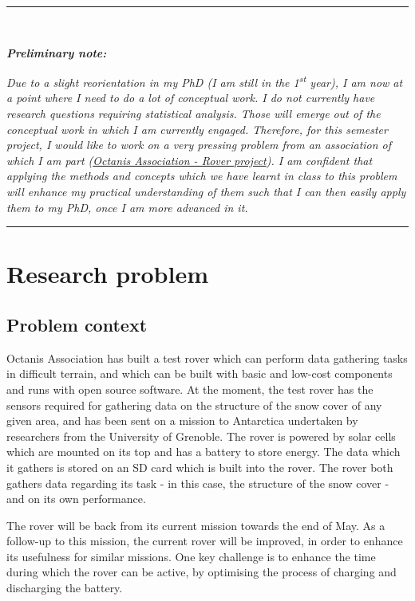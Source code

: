 \documentclass[11pt, UKenglish]{report}
\newcommand{\HRule}[1]{\rule{\linewidth}{#1}}
\begin{document}
\noindent \HRule{0.5pt} \\
\large{\textit{\textbf{Preliminary note:}} 

\normalsize

\noindent \textit{Due to a slight reorientation in my PhD (I am still in the 1\textsuperscript{st} year), I am now at a point where I need to do a lot of conceptual work. I do not currently have research questions requiring statistical analysis. Those will emerge out of the conceptual work in which I am currently engaged. Therefore, for this semester project, I would like to work on a very pressing problem from an association of which I am part (\href{http://octanis.org/rover/} {Octanis Association - Rover project}). I am confident that applying the methods and concepts which we have learnt in class to this problem will enhance my practical understanding of them such that I can then easily apply them to my PhD, once I am more advanced in it.}

\noindent \HRule{0.5pt}


\section*{Research problem}

\subsection*{Problem context}

Octanis Association has built a test rover which can perform data gathering tasks in difficult terrain, and which can be built with basic and low-cost components and runs with open source software. At the moment, the test rover has the sensors required for gathering data on the structure of the snow cover of any given area, and has been sent on a mission  to Antarctica undertaken by researchers from the University of Grenoble. The rover is powered by solar cells which are mounted on its top and has a battery to store energy. The data which it gathers is stored on an SD card which is built into the rover. The rover both gathers data regarding its task - in this case, the structure of the snow cover - and on its own performance. 

The rover will be back from its current mission towards the end of May. As a follow-up to this mission, the current rover will be improved, in order to enhance its usefulness for similar missions. One key challenge is to enhance the time during which the rover can be active, by optimising the process of charging and discharging the battery.

}
\end{document}
